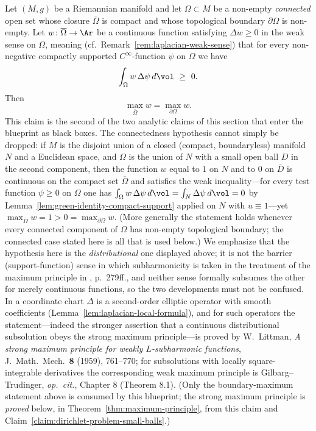 \begin{claim}
\label{claim:weak-subsolution-comparison}
Let $(M,g)$ be a Riemannian manifold and let $\Omega\subset M$ be a
non-empty {\it connected} open set whose closure $\overline{\Omega}$
is compact and whose topological boundary $\partial\Omega$ is
non-empty. Let $w\colon \overline{\Omega}\to\Ar$ be a continuous
function satisfying $\Delta w\ge 0$ in the weak sense on $\Omega$,
meaning (cf.\ Remark~\ref{rem:laplacian-weak-sense}) that for every
non-negative compactly supported $C^\infty$-function $\psi$ on
$\Omega$ we have
$$\int_\Omega w\,\Delta \psi\, d\vol\ \ge\ 0.$$
Then
$$\max_{\overline{\Omega}}w=\max_{\partial\Omega}w.$$
This claim is the second of the two analytic claims of this section
that enter the blueprint as black boxes. The connectedness
hypothesis cannot simply be dropped: if $M$ is the disjoint union
of a closed (compact, boundaryless) manifold $N$ and a Euclidean
space, and $\Omega$ is the union of $N$ with a small open ball $D$
in the second component, then the function $w$ equal to $1$ on $N$
and to $0$ on $\overline{D}$ is continuous on the compact set
$\overline{\Omega}$ and satisfies the weak inequality---for every
test function $\psi\ge0$ on $\Omega$ one has $\int_\Omega
w\,\Delta\psi\,d\vol=\int_N\Delta\psi\,d\vol=0$ by
Lemma~\ref{lem:green-identity-compact-support} applied on $N$ with
$u\equiv1$---yet $\max_{\overline{\Omega}}w=1>0
=\max_{\partial\Omega}w$. (More generally the statement holds
whenever every connected component of $\Omega$ has non-empty
topological boundary; the connected case stated here is all that is
used below.) We emphasize that the hypothesis here is the {\it
distributional} one displayed above; it is not the barrier
(support-function) sense in which subharmonicity is taken in the
treatment of the maximum principle in \cite{Petersen}, p.~279ff.,
and neither sense formally subsumes the other for merely continuous
functions, so the two developments must not be confused. In a
coordinate chart $\Delta$ is a second-order elliptic operator with
smooth coefficients (Lemma~\ref{lem:laplacian-local-formula}), and
for such operators the statement---indeed the stronger assertion
that a continuous distributional subsolution obeys the strong
maximum principle---is proved by W.~Littman, {\it A strong maximum
principle for weakly $L$-subharmonic functions}, J.~Math.\ Mech.\
{\bf 8} (1959), 761--770; for subsolutions with locally
square-integrable derivatives the corresponding weak maximum
principle is Gilbarg--Trudinger, {\it op.\ cit.}, Chapter 8
(Theorem 8.1). (Only the boundary-maximum statement above is
consumed by this blueprint; the strong maximum principle is {\it
proved} below, in Theorem~\ref{thm:maximum-principle}, from this
claim and Claim~\ref{claim:dirichlet-problem-small-balls}.)
\end{claim}

